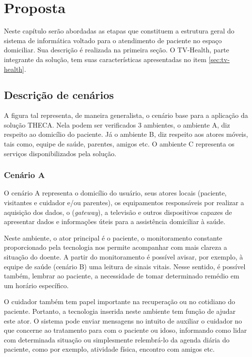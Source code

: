 \chapter{Proposta}\label{cap:proposta}

Neste capítulo serão abordadas as etapas que constituem a estrutura geral do
sistema de informática voltado para o atendimento de paciente no espaço domiciliar. 
Sua descrição é realizada na primeira seção. O TV-Health, parte integrante da 
solução, tem suas características apresentadas no item \ref{sec:tv-health}.

\section{Descrição de cenários}

A figura tal representa, de maneira generalista, o cenário base para a aplicação
da solução THECA. Nela podem ser verificados 3 ambientes, o ambiente A, diz
respeito ao domicílio do paciente. Já o ambiente B, diz respeito aos atores
móveis, tais como, equipe de saúde, parentes, amigos etc. O ambiente C
representa os serviços disponibilizados pela solução.


\subsection{Cenário A} \label{subsec:cenario-a}

O cenário A representa o domicílio do usuário, seus atores locais (paciente,
visitantes e cuidador e/ou parentes), os equipamentos responsáveis por 
realizar a aquisição dos dados, o \stb[] (\textit{gateway}), a televisão e outros
dispositivos capazes de apresentar dados e informações úteis para a assistência
domiciliar à saúde. 

Neste ambiente, o ator principal é o paciente, o monitoramento constante 
proporcionado pela tecnologia nos permite acompanhar com mais clareza a situação
do doente. A partir do monitoramento é possível avisar, por exemplo, à equipe
de saúde (cenário B) uma leitura de sinais vitais. Nesse sentido, é possível 
também, lembrar ao paciente, a necessidade de tomar determinado remédio em um
horário específico.

O cuidador também tem papel importante na recuperação ou no cotidiano do 
paciente. Portanto, a tecnologia inserida neste ambiente tem função de ajudar
este ator. O sistema pode enviar mensagens no intuito de auxiliar o cuidador no
que concerne ao tratamento para com o paciente ou idoso, informando como lidar
com determinada situação ou simplesmente relembrá-lo da agenda diária do 
paciente, como por exemplo, atividade física, encontro com amigos etc.

